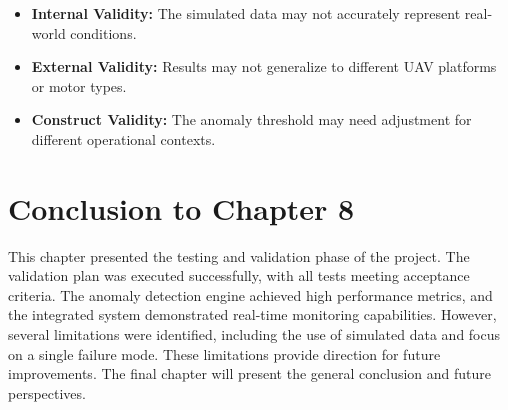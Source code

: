 \begin{itemize}
    \item \textbf{Internal Validity:} The simulated data may not accurately represent real-world conditions.
    \item \textbf{External Validity:} Results may not generalize to different UAV platforms or motor types.
    \item \textbf{Construct Validity:} The anomaly threshold may need adjustment for different operational contexts.
\end{itemize}

\section*{Conclusion to Chapter 8}

This chapter presented the testing and validation phase of the project. The validation plan was executed successfully, with all tests meeting acceptance criteria. The anomaly detection engine achieved high performance metrics, and the integrated system demonstrated real-time monitoring capabilities. However, several limitations were identified, including the use of simulated data and focus on a single failure mode. These limitations provide direction for future improvements. The final chapter will present the general conclusion and future perspectives.
